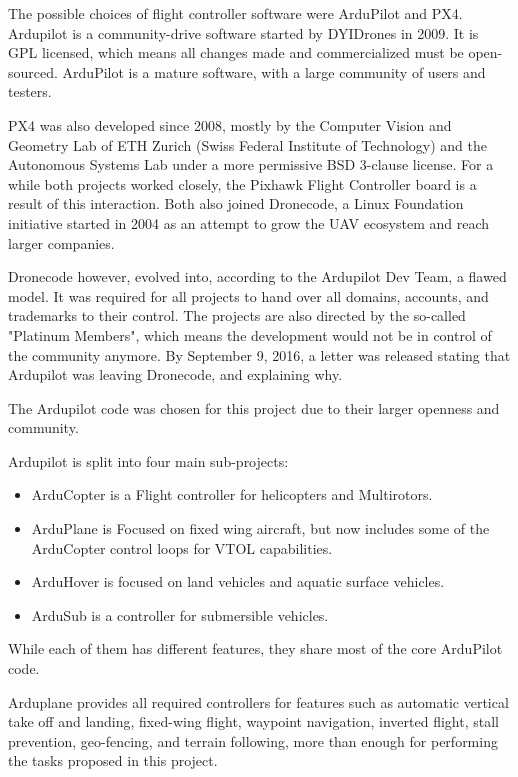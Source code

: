 The possible choices of flight controller software were ArduPilot and PX4.
%
Ardupilot is a community-drive software started by DYIDrones in 2009\cite{diydrones}.
%
It is GPL licensed, which means all changes made and commercialized must be open-sourced\cite{gplv3}.
%
ArduPilot is a mature software, with a large community of users and testers.
%

PX4 was also developed since 2008\cite{waybackmachine}, mostly by the Computer Vision and Geometry Lab of ETH Zurich (Swiss Federal Institute of Technology)\cite{computervision} and the Autonomous Systems Lab\cite{autonomouslab} under a more permissive BSD 3-clause license\cite{bsd}.
%
For a while both projects worked closely, the Pixhawk Flight Controller board is a result of this interaction.
%
Both also joined Dronecode\cite{dronecode}, a Linux Foundation\cite{linuxfoundation} initiative started in 2004 as an attempt to grow the UAV ecosystem and reach larger companies.
%

Dronecode however, evolved into, according to the Ardupilot Dev Team, a flawed model.
%
It was required for all projects to hand over all domains, accounts, and trademarks to their control.
%
The projects are also directed by the so-called "Platinum Members", which means the development would not be in control of the community anymore.
%
By September 9, 2016, a letter was released stating that Ardupilot was leaving Dronecode, and explaining why\cite{letter}.

The Ardupilot code was chosen for this project due to their larger openness and community.

Ardupilot is split into four main sub-projects:
\begin{itemize}
\item ArduCopter is a Flight controller for helicopters and Multirotors.
\item ArduPlane is Focused on fixed wing aircraft, but now includes some of the ArduCopter control loops for VTOL capabilities.
\item ArduHover is focused on land vehicles and aquatic surface vehicles.
\item ArduSub is a controller for submersible vehicles.
\end{itemize}

While each of them has different features, they share most of the core ArduPilot code.

Arduplane provides all required controllers for features such as automatic vertical take off and landing, fixed-wing flight, waypoint navigation, inverted flight, stall prevention, geo-fencing, and terrain following, more than enough for performing the tasks proposed in this project.

